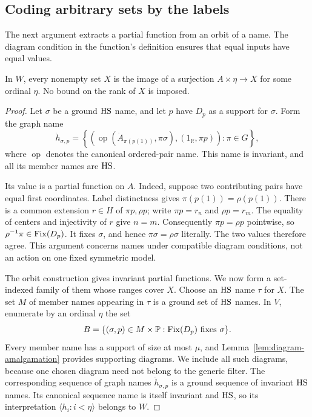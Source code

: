 \subsection{Coding arbitrary sets by the labels}

The next argument extracts a partial function from an orbit of a name.
The diagram condition in the function's definition ensures that equal
inputs have equal values.

\begin{proposition}\label{prop:presentation}
In \(W\), every nonempty set \(X\) is the image of a surjection
\(A\times\eta\to X\) for some ordinal \(\eta\).
No bound on the rank of \(X\) is imposed.
\end{proposition}

\begin{proof}
Let \(\sigma\) be a ground \(\mathrm{HS}\) name, and let \(p\) have
\(D_p\) as a support for \(\sigma\).
Form the graph name
\begin{equation}\label{eq:partial-orbit-map}
 \dot h_{\sigma,p}=
 \left\{\left(
    \operatorname{op}(\dot A_{\pi(p(1))},\pi\sigma),
                      (1_{\mathbb R},\pi p)\right):\pi\in G\right\},
\end{equation}
where \(\operatorname{op}\) denotes the canonical ordered-pair name.
This name is invariant, and all its member names are \(\mathrm{HS}\).

Its value is a partial function on \(A\).
Indeed, suppose two contributing pairs have equal first coordinates.
Label distinctness gives
\(\pi(p(1))=\rho(p(1))\).
There is a common extension \(r\in H\) of \(\pi p,\rho p\);
write \(\pi p=r_n\) and \(\rho p=r_m\).
The equality of centers and injectivity of \(r\) give \(n=m\).
Consequently \(\pi p=\rho p\) pointwise, so
\(\rho^{-1}\pi\in\operatorname{Fix}(D_p)\).
It fixes \(\sigma\), and hence \(\pi\sigma=\rho\sigma\)
literally.  The two values therefore agree.
This argument concerns names under compatible diagram conditions,
not an action on one fixed symmetric model.

The orbit construction gives invariant partial functions.  We now
form a set-indexed family of them whose ranges cover \(X\).
Choose an \(\mathrm{HS}\) name \(\tau\) for \(X\).
The set \(M\) of member names appearing in \(\tau\) is a ground
set of \(\mathrm{HS}\) names.  In \(V\), enumerate by an ordinal \(\eta\)
the set
\[
 B=\{(\sigma,p)\in M\times\mathbb P:
                         \operatorname{Fix}(D_p)\text{ fixes }\sigma\}.
\]
Every member name has a support of size at most \(\mu\), and
Lemma~\ref{lem:diagram-amalgamation} provides supporting diagrams.
We include all such diagrams, because one chosen diagram need not
belong to the generic filter.
The corresponding sequence of graph names
\(\dot h_{\sigma,p}\) is a ground sequence of invariant
\(\mathrm{HS}\) names.  Its canonical sequence name is itself invariant
and \(\mathrm{HS}\), so its interpretation
\(\langle h_i:i<\eta\rangle\) belongs to \(W\).


\end{proof}
